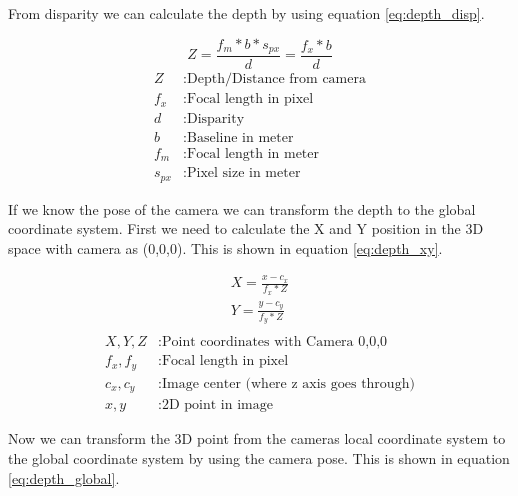 \documentclass[11pt,a4paper,titlepage,oneside]{report}
\begin{document}
From disparity we can calculate the depth by using equation \ref{eq:depth_disp}.

\begin{equation}\label{eq:depth_disp}
  Z=\frac{f_m*b*s_{px}}{d}=\frac{f_x*b}{d}
\end{equation}
\begin{align*}
  Z        &: \text{Depth/Distance from camera}\\
  f_x      &: \text{Focal length in pixel}\\
  d        &: \text{Disparity}\\
  b        &: \text{Baseline in meter}\\
  f_m      &: \text{Focal length in meter}\\
  s_{px}  &: \text{Pixel size in meter}
\end{align*}

If we know the pose of the camera we can transform the depth to the global coordinate system. First we need to calculate the X and Y position in the 3D space with camera as (0,0,0). This is shown in equation \ref{eq:depth_xy}.

\begin{equation}\label{eq:depth_xy}
  \begin{gathered}
    X = \frac{x-c_x}{f_x*Z}\\
    Y = \frac{y-c_y}{f_y*Z}\\
  \end{gathered}
\end{equation}
\begin{align*}
  X,Y,Z    &: \text{Point coordinates with Camera 0,0,0}\\
  f_x,f_y  &: \text{Focal length in pixel}\\
  c_x,c_y  &: \text{Image center (where z axis goes through)}\\
  x,y      &: \text{2D point in image}
\end{align*}

Now we can transform the 3D point from the cameras local coordinate system to the global coordinate system by using the camera pose. This is shown in equation \ref{eq:depth_global}.
\end{document}
